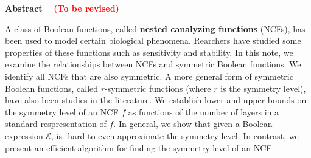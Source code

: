 \vspace*{-0.05in}
\begin{center}
\textbf{Abstract}~~ \textcolor{red}{\textbf{(To be revised)}}
\end{center}

\smallskip

A class of Boolean functions, 
called \textbf{nested canalyzing functions} (NCFs),
has been used to model certain biological phenomena.
Rearchers have studied some properties of these functions
such as sensitivity and stability.
In this note, we examine the relationships between NCFs and symmetric 
Boolean functions. 
We identify all NCFs that are also symmetric. 
A more general form of symmetric Boolean functions,
called $r$-symmetric functions (where $r$ is the symmetry level),
have also been studies in the literature.
We establish lower and upper bounds on the symmetry
level of an NCF $f$ as functions of the number of layers
in a standard respresentation of $f$.  
In general, we show that given a Boolean expression $\mathcal{E}$,
is \cnp-hard to even approximate the symmetry level.
In contrast, we present an efficient algorithm for
finding the symmetry level of an NCF.


